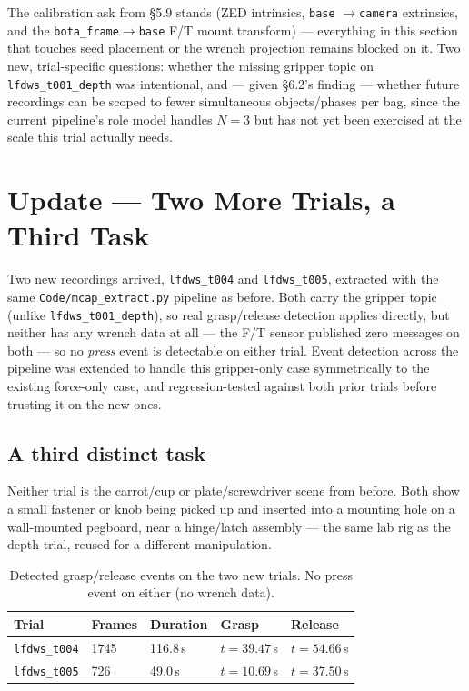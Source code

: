 \documentclass[11pt]{article}
\begin{document}
The calibration ask from \S5.9 stands (ZED intrinsics, \texttt{base}
$\to$\texttt{camera} extrinsics, and the \texttt{bota\_frame}$\to$\texttt{base}
F/T mount transform) --- everything in this section that touches seed
placement or the wrench projection remains blocked on it. Two new,
trial-specific questions: whether the missing gripper topic on
\texttt{lfdws\_t001\_depth} was intentional, and --- given \S6.2's finding
--- whether future recordings can be scoped to fewer simultaneous
objects/phases per bag, since the current pipeline's role model handles
$N{=}3$ but has not yet been exercised at the scale this trial actually
needs.

\clearpage

\section{Update --- Two More Trials, a Third Task}

Two new recordings arrived, \texttt{lfdws\_t004} and \texttt{lfdws\_t005},
extracted with the same \texttt{Code/mcap\_extract.py} pipeline as before.
Both carry the gripper topic (unlike \texttt{lfdws\_t001\_depth}), so real
grasp/release detection applies directly, but neither has any wrench data
at all --- the F/T sensor published zero messages on both --- so no
\textit{press} event is detectable on either trial. Event detection across
the pipeline was extended to handle this gripper-only case symmetrically
to the existing force-only case, and regression-tested against both prior
trials before trusting it on the new ones.

\subsection{A third distinct task}

Neither trial is the carrot/cup or plate/screwdriver scene from before.
Both show a small fastener or knob being picked up and inserted into a
mounting hole on a wall-mounted pegboard, near a hinge/latch assembly ---
the same lab rig as the depth trial, reused for a different manipulation.

\begin{table}[H]
\centering
\begin{tabular}{lllll}
\toprule
\textbf{Trial} & \textbf{Frames} & \textbf{Duration} & \textbf{Grasp} & \textbf{Release} \\
\midrule
\texttt{lfdws\_t004} & 1745 & 116.8\,s & $t{=}39.47$\,s & $t{=}54.66$\,s \\
\texttt{lfdws\_t005} & 726  & 49.0\,s  & $t{=}10.69$\,s & $t{=}37.50$\,s \\
\bottomrule
\end{tabular}
\caption{Detected grasp/release events on the two new trials. No press
event on either (no wrench data).}
\end{table}
\end{document}

